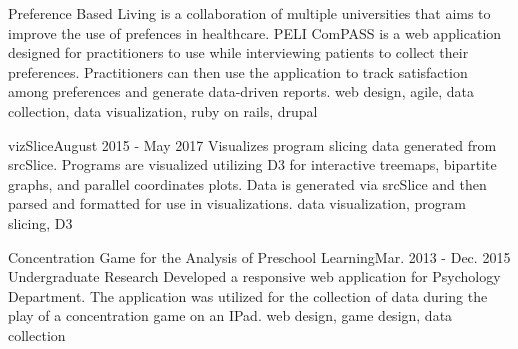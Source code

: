 %
%
%


\begin{projects}
    {}
    {Preference Based Living is a collaboration of multiple universities that aims to improve the use of prefences in healthcare. PELI ComPASS is a web application designed for practitioners to use while interviewing patients to collect their preferences.  Practitioners can then use the application to track satisfaction among preferences and generate data-driven reports.}
    {web design, agile, data collection, data visualization, ruby on rails, drupal}

	\project
	{vizSlice}{August 2015 - May 2017}
	{  }
	{
	    Visualizes program slicing data generated from srcSlice.  Programs are visualized utilizing D3 for interactive treemaps, bipartite graphs, and parallel coordinates plots.  Data is generated via srcSlice and then parsed and formatted for use in visualizations.
	}
	{data visualization, program slicing, D3}
	 
	\project
	{Concentration Game for the Analysis of Preschool Learning}{Mar. 2013 - Dec. 2015}
	{Undergraduate Research}
	{
	    Developed a responsive web application for Psychology Department.  The application was utilized for the collection of data during the play of a concentration game on an IPad.
	}
	{web design, game design, data collection}
				
\end{projects}